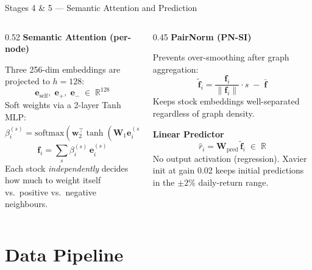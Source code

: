 \documentclass[aspectratio=169, 10pt]{beamer}
\newcommand{\myvec}[1]{\mathbf{#1}}
\begin{document}
\begin{frame}{Stages 4 \& 5 — Semantic Attention and Prediction}
  \begin{columns}[T]
    \begin{column}{0.52\textwidth}
      \textbf{Semantic Attention (per-node)}

      Three 256-dim embeddings are projected to $h=128$:
      \[
        \myvec{e}_\text{self},\;\myvec{e}_+,\;\myvec{e}_-
        \;\in\;\mathbb{R}^{128}
      \]
      Soft weights via a 2-layer Tanh MLP:
      \[
        \beta_i^{(s)} = \text{softmax}\!\left(
          \myvec{w}_2^\top \tanh\!\left(\myvec{W}_1 \myvec{e}_i^{(s)}\right)
        \right)_{s=1}^3
      \]
      \[
        \myvec{f}_i = \sum_{s} \beta_i^{(s)}\,\myvec{e}_i^{(s)}
      \]
      Each stock \emph{independently} decides how much to weight itself
      vs.\ positive vs.\ negative neighbours.
    \end{column}
    \begin{column}{0.45\textwidth}
      \textbf{PairNorm (PN-SI)}

      Prevents over-smoothing after graph aggregation:
      \[
        \tilde{\myvec{f}}_i = \frac{\myvec{f}_i}{\|\myvec{f}_i\|} \cdot s
        \;-\;\bar{\myvec{f}}
      \]
      Keeps stock embeddings well-separated regardless of graph density.

      \bigskip
      \textbf{Linear Predictor}
      \[
        \hat{r}_i = \myvec{W}_\text{pred}\,\tilde{\myvec{f}}_i \;\in\;\mathbb{R}
      \]
      No output activation (regression). Xavier init at gain 0.02 keeps
      initial predictions in the $\pm 2\%$ daily-return range.
    \end{column}
  \end{columns}
\end{frame}

\section{Data Pipeline}
\end{document}
